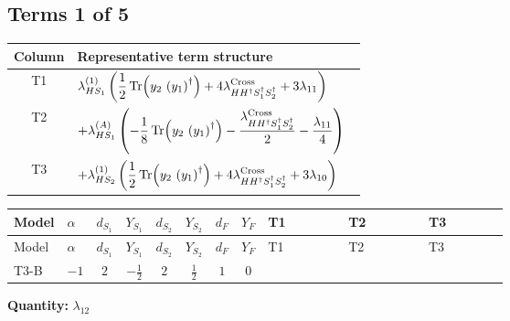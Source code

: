 \documentclass[8pt]{article}
\begin{document}
\begin{landscape}
\subsection*{Terms 1 of 5}
\begin{center}
\begin{tabular}{@{}c >{\raggedright\arraybackslash}p{0.82\linewidth}@{}}
\toprule
Column & Representative term structure \\
\midrule
T1 & \(\displaystyle {\lambda_{HS_1}^{(1)}} \left(\frac{1}{2} \operatorname{Tr}\!\left({y_2}\,\left({y_1}\right)^{\dagger}\right)+4 {\lambda_{H H^\dagger S_1^\dagger S_2^\dagger}^{\rm Cross}}+3 {\lambda_{11}}\right)\) \\
\midrule
T2 & \(\displaystyle +{\lambda_{HS_1}^{(A)}} \left(-\frac{1}{8} \operatorname{Tr}\!\left({y_2}\,\left({y_1}\right)^{\dagger}\right)-\frac{{\lambda_{H H^\dagger S_1^\dagger S_2^\dagger}^{\rm Cross}}}{2}-\frac{{\lambda_{11}}}{4}\right)\) \\
\midrule
T3 & \(\displaystyle +{\lambda_{HS_2}^{(1)}} \left(\frac{1}{2} \operatorname{Tr}\!\left({y_2}\,\left({y_1}\right)^{\dagger}\right)+4 {\lambda_{H H^\dagger S_1^\dagger S_2^\dagger}^{\rm Cross}}+3 {\lambda_{10}}\right)\) \\
\midrule
\bottomrule
\end{tabular}
\end{center}
\smallskip
\tiny
\begin{longtable}{@{}llcccccc >{\raggedright\arraybackslash}p{0.21\linewidth} >{\raggedright\arraybackslash}p{0.21\linewidth} >{\raggedright\arraybackslash}p{0.21\linewidth}@{}}
\toprule
Model & $\alpha$ & $d_{S_1}$ & $Y_{S_1}$ & $d_{S_2}$ & $Y_{S_2}$ & $d_F$ & $Y_F$ & T1 & T2 & T3 \\
\midrule
\endfirsthead
\toprule
Model & $\alpha$ & $d_{S_1}$ & $Y_{S_1}$ & $d_{S_2}$ & $Y_{S_2}$ & $d_F$ & $Y_F$ & T1 & T2 & T3 \\
\midrule
\endhead
T3-B & $-1$ & $2$ & $-\frac{1}{2}$ & $2$ & $\frac{1}{2}$ & $1$ & $0$ & \scriptsize\adjustbox{max width=\linewidth}{$\begin{gathered} {\lambda_{HS_1}^{(1)}} \left(\frac{1}{2} \operatorname{Tr}\!\left({y_2}\,\left({y_1}\right)^{\dagger}\right)+4 {\lambda_{H H^\dagger S_1^\dagger S_2^\dagger}^{\rm Cross}}+3 {\lambda_{11}}\right)\end{gathered}$} & \scriptsize\adjustbox{max width=\linewidth}{$\begin{gathered} +{\lambda_{HS_1}^{(A)}} \left(-\frac{1}{8} \operatorname{Tr}\!\left({y_2}\,\left({y_1}\right)^{\dagger}\right)-\frac{{\lambda_{H H^\dagger S_1^\dagger S_2^\dagger}^{\rm Cross}}}{2}-\frac{{\lambda_{11}}}{4}\right)\end{gathered}$} & \scriptsize\adjustbox{max width=\linewidth}{$\begin{gathered} +{\lambda_{HS_2}^{(1)}} \left(\frac{1}{2} \operatorname{Tr}\!\left({y_2}\,\left({y_1}\right)^{\dagger}\right)+4 {\lambda_{H H^\dagger S_1^\dagger S_2^\dagger}^{\rm Cross}}+3 {\lambda_{10}}\right)\end{gathered}$} \\
\midrule
\bottomrule
\end{longtable}
\clearpage
\noindent\textbf{Quantity: }$\lambda_{12}$\par\smallskip

\end{landscape}
\end{document}
